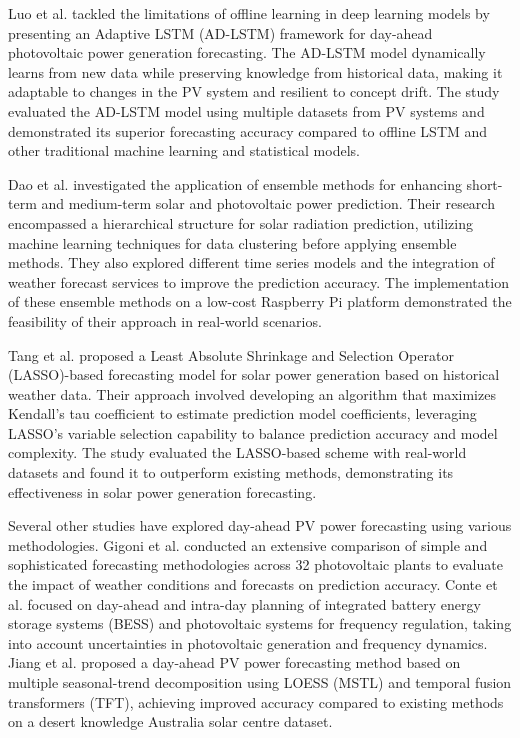 Luo et al. \cite{arxiv2109.13442} tackled the limitations of offline learning in deep learning models by presenting an Adaptive LSTM (AD-LSTM) framework for day-ahead photovoltaic power generation forecasting. The AD-LSTM model dynamically learns from new data while preserving knowledge from historical data, making it adaptable to changes in the PV system and resilient to concept drift. The study evaluated the AD-LSTM model using multiple datasets from PV systems and demonstrated its superior forecasting accuracy compared to offline LSTM and other traditional machine learning and statistical models.

Dao et al. \cite{arxiv2011.09950} investigated the application of ensemble methods for enhancing short-term and medium-term solar and photovoltaic power prediction. Their research encompassed a hierarchical structure for solar radiation prediction, utilizing machine learning techniques for data clustering before applying ensemble methods. They also explored different time series models and the integration of weather forecast services to improve the prediction accuracy. The implementation of these ensemble methods on a low-cost Raspberry Pi platform demonstrated the feasibility of their approach in real-world scenarios.

Tang et al. \cite{ieee8306874} proposed a Least Absolute Shrinkage and Selection Operator (LASSO)-based forecasting model for solar power generation based on historical weather data. Their approach involved developing an algorithm that maximizes Kendall's tau coefficient to estimate prediction model coefficients, leveraging LASSO's variable selection capability to balance prediction accuracy and model complexity. The study evaluated the LASSO-based scheme with real-world datasets and found it to outperform existing methods, demonstrating its effectiveness in solar power generation forecasting.

Several other studies have explored day-ahead PV power forecasting using various methodologies. Gigoni et al. \cite{ieee8066360} conducted an extensive comparison of simple and sophisticated forecasting methodologies across 32 photovoltaic plants to evaluate the impact of weather conditions and forecasts on prediction accuracy. Conte et al. \cite{ieee8066360} focused on day-ahead and intra-day planning of integrated battery energy storage systems (BESS) and photovoltaic systems for frequency regulation, taking into account uncertainties in photovoltaic generation and frequency dynamics. Jiang et al. \cite{arxiv2301.05911} proposed a day-ahead PV power forecasting method based on multiple seasonal-trend decomposition using LOESS (MSTL) and temporal fusion transformers (TFT), achieving improved accuracy compared to existing methods on a desert knowledge Australia solar centre dataset.


